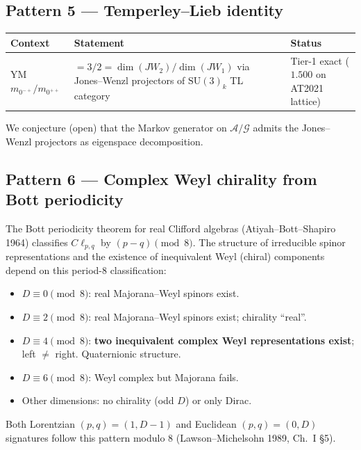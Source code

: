 \documentclass[11pt,a4paper]{article}
\newcommand{\SU}{\mathrm{SU}}
\begin{document}
\subsection*{Pattern 5 --- Temperley--Lieb identity}

\begin{tabularx}{\textwidth}{lXl}
\toprule
Context & Statement & Status \\
\midrule
YM $m_{0^{-+}}/m_{0^{++}}$ & $= 3/2 = \dim(JW_2)/\dim(JW_1)$ via Jones--Wenzl projectors of $\SU(3)_k$ TL category & Tier-1 exact ($1.500$ on AT2021 lattice) \\
\bottomrule
\end{tabularx}

We conjecture (open) that the Markov generator on $\mathcal{A}/\mathcal{G}$ admits the Jones--Wenzl projectors as eigenspace decomposition.

\subsection{Pattern 6 --- Complex Weyl chirality from Bott periodicity}\label{sec:pattern6}

The Bott periodicity theorem for real Clifford algebras (Atiyah--Bott--Shapiro 1964) classifies $C\ell_{p,q}$ by $(p - q) \pmod 8$. The structure of irreducible spinor representations and the existence of inequivalent Weyl (chiral) components depend on this period-8 classification:
\begin{itemize}[leftmargin=*,itemsep=2pt]
  \item $D \equiv 0 \pmod 8$: real Majorana--Weyl spinors exist.
  \item $D \equiv 2 \pmod 8$: real Majorana--Weyl spinors exist; chirality ``real''.
  \item $D \equiv 4 \pmod 8$: \textbf{two inequivalent complex Weyl representations exist}; left $\neq$ right. Quaternionic structure.
  \item $D \equiv 6 \pmod 8$: Weyl complex but Majorana fails.
  \item Other dimensions: no chirality (odd $D$) or only Dirac.
\end{itemize}
Both Lorentzian $(p, q) = (1, D - 1)$ and Euclidean $(p, q) = (0, D)$ signatures follow this pattern modulo 8 (Lawson--Michelsohn 1989, Ch.~I \S 5).
\end{document}
